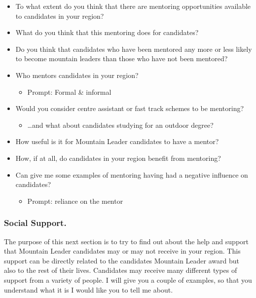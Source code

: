 \documentclass[
  12pt,
  a4paper,
]{book}
\providecommand{\tightlist}{%
  \setlength{\itemsep}{0pt}\setlength{\parskip}{0pt}}
\begin{document}
\begin{itemize}
\tightlist
\item
  To what extent do you think that there are mentoring opportunities available to candidates in your region?
\item
  What do you think that this mentoring does for candidates?
\item
  Do you think that candidates who have been mentored any more or less likely to become mountain leaders than those who have not been mentored?
\item
  Who mentors candidates in your region?

  \begin{itemize}
  \tightlist
  \item
    Prompt: Formal \& informal
  \end{itemize}
\item
  Would you consider centre assistant or fast track schemes to be mentoring?

  \begin{itemize}
  \tightlist
  \item
    \ldots and what about candidates studying for an outdoor degree?
  \end{itemize}
\item
  How useful is it for Mountain Leader candidates to have a mentor?
\item
  How, if at all, do candidates in your region benefit from mentoring?
\item
  Can give me some examples of mentoring having had a negative influence on candidates?

  \begin{itemize}
  \tightlist
  \item
    Prompt: reliance on the mentor
  \end{itemize}
\end{itemize}

\hypertarget{social-support.}{%
\subsubsection{Social Support.}\label{social-support.}}

The purpose of this next section is to try to find out about the help and support that Mountain Leader candidates may or may not receive in your region. This support can be directly related to the candidates Mountain Leader award but also to the rest of their lives. Candidates may receive many different types of support from a variety of people. I will give you a couple of examples, so that you understand what it is I would like you to tell me about.
\end{document}
